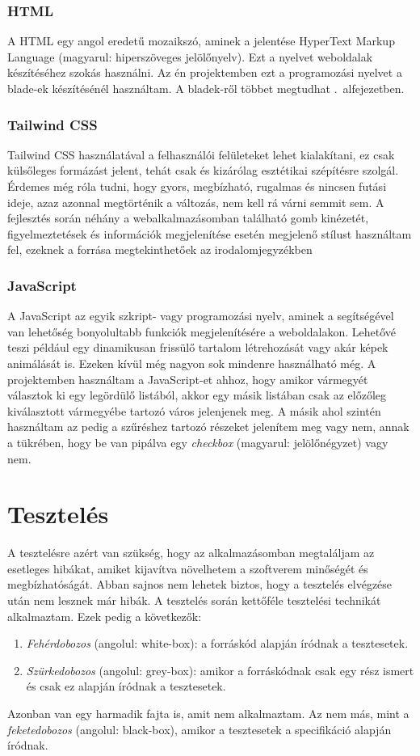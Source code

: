 \documentclass[]{thesis-ekf}
\theoremstyle{definition}
\theoremstyle{remark}
\begin{document}
	\subsection{HTML}
		A HTML egy angol eredetű mozaikszó, aminek a jelentése HyperText Markup Language (magyarul: hiperszöveges jelölőnyelv). Ezt a nyelvet weboldalak készítéséhez szokás használni. Az én projektemben ezt a programozási nyelvet a blade-ek készítésénél használtam. A bladek-ről többet megtudhat .~alfejezetben.   
	\subsection{Tailwind CSS}\label{sc-tailwind}
		Tailwind CSS használatával a felhasználói felületeket lehet kialakítani, ez csak külsőleges formázást jelent, tehát csak és kizárólag esztétikai szépítésre szolgál. Érdemes még róla tudni, hogy gyors, megbízható, rugalmas és nincsen futási ideje, azaz azonnal megtörténik a változás, nem kell rá várni semmit sem. A fejlesztés során néhány a webalkalmazásomban található gomb kinézetét, figyelmeztetések és információk megjelenítése esetén megjelenő stílust használtam fel, ezeknek a forrása megtekinthetőek az irodalomjegyzékben \cite{tailwind, FlowBite}
	\subsection{JavaScript}\label{javascript}
		A JavaScript az egyik szkript- vagy programozási nyelv, aminek a segítségével van lehetőség bonyolultabb funkciók megjelenítésére a weboldalakon. Lehetővé teszi például egy dinamikusan frissülő tartalom létrehozását vagy akár képek animálását is. Ezeken kívül még nagyon sok mindenre használható még. A projektemben használtam a JavaScript-et ahhoz, hogy amikor vármegyét választok ki egy legördülő listából, akkor egy másik listában csak az előzőleg kiválasztott vármegyébe tartozó város jelenjenek meg. A másik ahol szintén használtam az pedig a szűréshez tartozó részeket jelenítem meg vagy nem, annak a tükrében, hogy be van pipálva egy \emph{checkbox} (magyarul: jelölőnégyzet) vagy nem. \cite{JavaScript}
		
	\chapter{Tesztelés}
		A tesztelésre azért van szükség, hogy az alkalmazásomban megtaláljam az esetleges hibákat, amiket kijavítva növelhetem a szoftverem minőségét és megbízhatóságát. Abban sajnos nem lehetek biztos, hogy a tesztelés elvégzése után nem lesznek már hibák. A tesztelés során kettőféle tesztelési technikát alkalmaztam. Ezek pedig a következők:
		\begin{enumerate}
			\item \emph{Fehérdobozos} (angolul: white-box): a forráskód alapján íródnak a tesztesetek.
			\item \emph{Szürkedobozos} (angolul: grey-box): amikor a forráskódnak csak egy rész ismert és csak ez alapján íródnak a tesztesetek.
		\end{enumerate}
		Azonban van egy harmadik fajta is, amit nem alkalmaztam. Az nem más, mint a \emph{feketedobozos} (angolul: black-box), amikor a tesztesetek a specifikáció alapján íródnak.
		\cite{Kusper}
\end{document}
